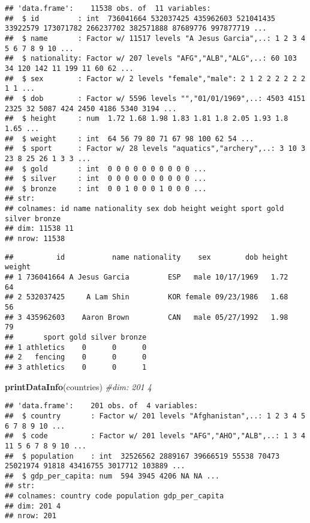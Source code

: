 \documentclass[]{article}
\newenvironment{Shaded}{\begin{snugshade}}{\end{snugshade}}
\newcommand{\CommentTok}[1]{\textcolor[rgb]{0.56,0.35,0.01}{\textit{#1}}}
\newcommand{\KeywordTok}[1]{\textcolor[rgb]{0.13,0.29,0.53}{\textbf{#1}}}
\newcommand{\NormalTok}[1]{#1}
\begin{document}
\begin{verbatim}
## 'data.frame':    11538 obs. of  11 variables:
##  $ id         : int  736041664 532037425 435962603 521041435 33922579 173071782 266237702 382571888 87689776 997877719 ...
##  $ name       : Factor w/ 11517 levels "A Jesus Garcia",..: 1 2 3 4 5 6 7 8 9 10 ...
##  $ nationality: Factor w/ 207 levels "AFG","ALB","ALG",..: 60 103 34 120 142 11 199 11 60 62 ...
##  $ sex        : Factor w/ 2 levels "female","male": 2 1 2 2 2 2 2 2 1 1 ...
##  $ dob        : Factor w/ 5596 levels "","01/01/1969",..: 4503 4151 2325 32 5087 424 2450 4186 5340 3194 ...
##  $ height     : num  1.72 1.68 1.98 1.83 1.81 1.8 2.05 1.93 1.8 1.65 ...
##  $ weight     : int  64 56 79 80 71 67 98 100 62 54 ...
##  $ sport      : Factor w/ 28 levels "aquatics","archery",..: 3 10 3 23 8 25 26 1 3 3 ...
##  $ gold       : int  0 0 0 0 0 0 0 0 0 0 ...
##  $ silver     : int  0 0 0 0 0 0 0 0 0 0 ...
##  $ bronze     : int  0 0 1 0 0 0 1 0 0 0 ...
## str: 
## colnames: id name nationality sex dob height weight sport gold silver bronze 
## dim: 11538 11 
## nrow: 11538
\end{verbatim}

\begin{verbatim}
##          id           name nationality    sex        dob height weight
## 1 736041664 A Jesus Garcia         ESP   male 10/17/1969   1.72     64
## 2 532037425     A Lam Shin         KOR female 09/23/1986   1.68     56
## 3 435962603    Aaron Brown         CAN   male 05/27/1992   1.98     79
##       sport gold silver bronze
## 1 athletics    0      0      0
## 2   fencing    0      0      0
## 3 athletics    0      0      1
\end{verbatim}

\begin{Shaded}
\begin{Highlighting}[]
  \KeywordTok{printDataInfo}\NormalTok{(countries) }\CommentTok{#dim: 201 4}
\end{Highlighting}
\end{Shaded}

\begin{verbatim}
## 'data.frame':    201 obs. of  4 variables:
##  $ country       : Factor w/ 201 levels "Afghanistan",..: 1 2 3 4 5 6 7 8 9 10 ...
##  $ code          : Factor w/ 201 levels "AFG","AHO","ALB",..: 1 3 4 11 5 6 7 8 9 10 ...
##  $ population    : int  32526562 2889167 39666519 55538 70473 25021974 91818 43416755 3017712 103889 ...
##  $ gdp_per_capita: num  594 3945 4206 NA NA ...
## str: 
## colnames: country code population gdp_per_capita 
## dim: 201 4 
## nrow: 201
\end{verbatim}
\end{document}
